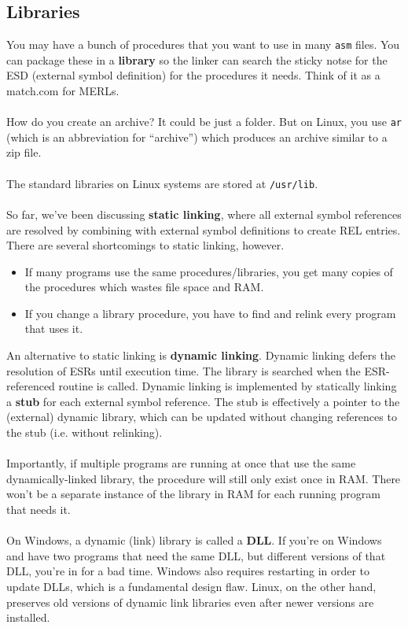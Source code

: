 \documentclass[]{article}
\theoremstyle{definition}
\begin{document}
			\subsection{Libraries}
				You may have a bunch of procedures that you want to use in many \verb+asm+ files. You can package these in a \textbf{library} so the linker can search the sticky notse for the ESD (external symbol definition) for the procedures it needs. Think of it as a match.com for MERLs.
				\\ \\
				How do you create an archive? It could be just a folder. But on Linux, you use \verb+ar+ (which is an abbreviation for ``archive'') which produces an archive similar to a zip file.
				\\ \\
				The standard libraries on Linux systems are stored at \verb+/usr/lib+.
				\\ \\
				So far, we've been discussing \textbf{static linking}, where all external symbol references are resolved by combining with external symbol definitions to create REL entries. There are several shortcomings to static linking, however.
				\begin{itemize}
					\item If many programs use the same procedures/libraries, you get many copies of the procedures which wastes file space and RAM.
					\item If you change a library procedure, you have to find and relink every program that uses it.
				\end{itemize}
				An alternative to static linking is \textbf{dynamic linking}. Dynamic linking defers the resolution of ESRs until execution time. The library is searched when the ESR-referenced routine is called. Dynamic linking is implemented by statically linking a \textbf{stub} for each external symbol reference. The stub is effectively a pointer to the (external) dynamic library, which can be updated without changing references to the stub (i.e. without relinking). 
				\\ \\
				Importantly, if multiple programs are running at once that use the same dynamically-linked library, the procedure will still only exist once in RAM. There won't be a separate instance of the library in RAM for each running program that needs it.
				\\ \\
				On Windows, a dynamic (link) library is called a \textbf{DLL}. If you're on Windows and have two programs that need the same DLL, but different versions of that DLL, you're in for a bad time. Windows also requires restarting in order to update DLLs, which is a fundamental design flaw. Linux, on the other hand, preserves old versions of dynamic link libraries even after newer versions are installed.
\end{document}
